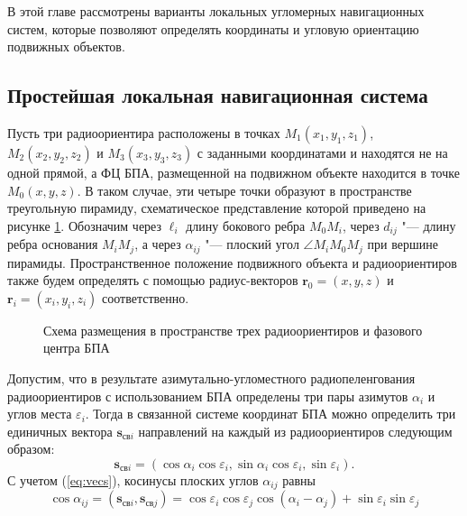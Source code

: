\documentclass[../main.tex]{subfiles}
\begin{document}
В этой главе рассмотрены варианты локальных угломерных навигационных систем, которые позволяют определять координаты и угловую ориентацию подвижных объектов.

%
%
%
\subsection{Простейшая локальная навигационная система}
Пусть три радиоориентира расположены в точках $M_1\left(x_1, y_1, z_1\right)$, $M_2\left(x_2, y_2, z_2\right)$ и $M_3\left(x_3, y_3, z_3\right)$ с заданными координатами и находятся не на одной прямой, а ФЦ БПА, размещенной на подвижном объекте находится в точке $M_0\left(x, y, z\right)$. В таком случае, эти четыре точки образуют в пространстве треугольную пирамиду, схематическое представление которой приведено на рисунке \ref{fig:tetrahedron:pic1}. Обозначим через $\ell_i$ длину бокового ребра $M_0M_i$, через $d_{ij}$ "--- длину ребра основания $M_iM_j$, а через $\alpha_{ij}$ "--- плоский угол $\angle M_iM_0M_j$ при вершине пирамиды. Пространственное положение подвижного объекта и радиоориентиров также будем определять с помощью радиус-векторов $\mathbf{r}_0 = \left(x, y, z\right)$ и $\mathbf{r}_i = \left(x_i, y_i, z_i\right)$ соответственно.

\begin{figure}[htbp]
    \centering


    \caption{Схема размещения в пространстве трех радиоориентиров и фазового центра БПА}
    \label{fig:tetrahedron:pic1}
\end{figure}

Допустим, что в результате азимутально-угломестного радиопеленгования радиоориентиров с использованием БПА определены три пары азимутов $\alpha_{i}$ и углов места $\varepsilon_{i}$. Тогда в связанной системе координат БПА можно определить три единичных вектора $\mathbf{s}_{\text{св}i}$ направлений на каждый из радиоориентиров следующим образом:
\begin{equation}\label{eq:vecs}
    \mathbf{s}_{\text{св}i} = \left(\cos\alpha_i \cos\varepsilon_i, \sin\alpha_i\cos\varepsilon_i, \sin\varepsilon_i\right).
\end{equation}
С учетом (\ref{eq:vecs}), косинусы плоских углов $\alpha_{ij}$ равны
\begin{equation}
    \cos\alpha_{ij} = \left(\mathbf{s}_{\text{св}i}, \mathbf{s}_{\text{св}j}\right) =
    \cos\varepsilon_i \cos\varepsilon_j \cos\left(\alpha_i - \alpha_j\right) + \sin\varepsilon_i \sin\varepsilon_j
\end{equation}
\end{document}
